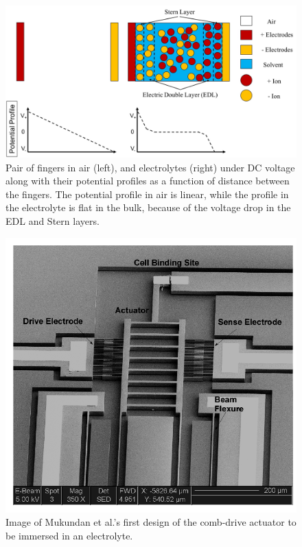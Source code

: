 \begin{figure}[h]
    \includegraphics[width=\linewidth]{Chapter2/Figs/Raster/potprofile_air_vs_electrolyte.png}
    \caption{Pair of fingers in air (left), and electrolytes (right) under DC voltage along with their potential profiles as a function of distance between the fingers. The potential profile in air is linear, while the profile in the electrolyte is flat in the bulk, because of the voltage drop in the EDL and Stern layers.} \label{pot_profiles}
\end{figure}

\begin{figure}[htpb]
    \begin{center}
    \includegraphics[width=0.6\linewidth]{Chapter2/Figs/Raster/vikramDesgn1.png}
    \caption{Image of Mukundan et al.'s first design of the comb-drive actuator to be immersed in an electrolyte.} \label{vik_design_1}
    \end{center}
\end{figure}

